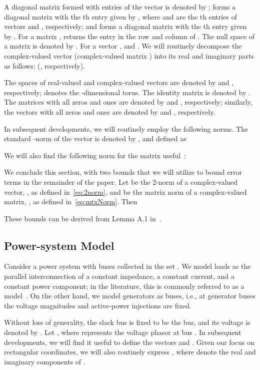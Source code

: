 \documentclass[10 pt, conference]{ieeeconf}
\begin{document}
A diagonal matrix formed with entries of the vector  is denoted by ;  
 forms a diagonal matrix with the th entry given by , where  and  are the th entries of vectors  and , respectively; and  forms a diagonal matrix with the th entry given by . For a matrix ,  returns the entry in the  row and  column of . The null space of a matrix  is denoted by . For a vector ,  and . We will routinely decompose the complex-valued vector  (complex-valued matrix ) into its real and imaginary parts as follows:  (, respectively). 

The spaces of  real-valued and complex-valued vectors are denoted by  and , respectively;  denotes the -dimensional torus. 
The  identity matrix is denoted by . The  matrices with all zeros and ones are denoted by  and , respectively; similarly, the  vectors with all zeros and ones are denoted by  and , respectively. 

In subsequent developments, we will routinely employ the following norms. The standard -norm of the vector  is denoted by , and defined as

We will also find the following norm for the matrix  useful~\cite{Bolognani-2015}:


We conclude this section, with two bounds that we will utilize to bound error terms in the remainder of the paper. Let  be the 2-norm of a complex-valued vector, , as defined in~\eqref{eq:2norm}, and  be the matrix norm of a complex-valued matrix, , as defined in~\eqref{eq:mtxNorm}.  Then

These bounds can be derived from Lemma A.1 in~\cite{Bolognani-2015}.

\subsection{Power-system Model}
Consider a power system with  buses collected in the set . We model loads as the parallel interconnection of a constant impedance, a constant current, and a constant power component; in the literature, this is commonly referred to as a  model~\cite{price1993load}. On the other hand, we model generators as  buses, i.e., at generator buses the voltage magnitudes and active-power injections are fixed.

Without loss of generality, the slack bus is fixed to be the  bus, and its voltage is denoted by . Let , where  represents the voltage phasor at bus . In subsequent developments, we will find it useful to define the vectors  and . Given our focus on rectangular coordinates, we will also routinely express , where  denote the real and imaginary components of .
\end{document}
